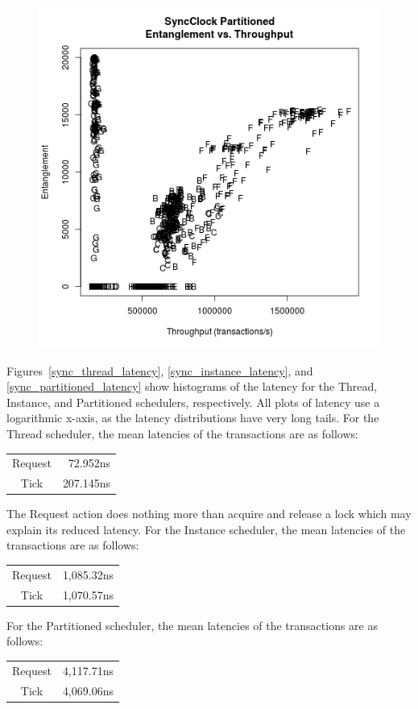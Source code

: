 \begin{figure}
\center
\includegraphics[height=.4\textheight]{sync_partitioned_throughput_entanglement.png}
\caption{\label{sync_partitioned_throughput_entanglement}}
\end{figure}

Figures~\ref{sync_thread_latency}, \ref{sync_instance_latency}, and \ref{sync_partitioned_latency} show histograms of the latency for the Thread, Instance, and Partitioned schedulers, respectively.
All plots of latency use a logarithmic x-axis, as the latency distributions have very long tails.
For the Thread scheduler, the mean latencies of the transactions are as follows:
\begin{center}
\begin{tabular}{cr}
Request &  72.952ns \\
Tick    & 207.145ns \\
\end{tabular}
\end{center}
The Request action does nothing more than acquire and release a lock which may explain its reduced latency.
For the Instance scheduler, the mean latencies of the transactions are as follows:
\begin{center}
\begin{tabular}{cr}
Request & 1,085.32ns \\
Tick    & 1,070.57ns \\
\end{tabular}
\end{center}
For the Partitioned scheduler, the mean latencies of the transactions are as follows:
\begin{center}
\begin{tabular}{cr}
Request & 4,117.71ns \\
Tick    & 4,069.06ns \\
\end{tabular}
\end{center}

